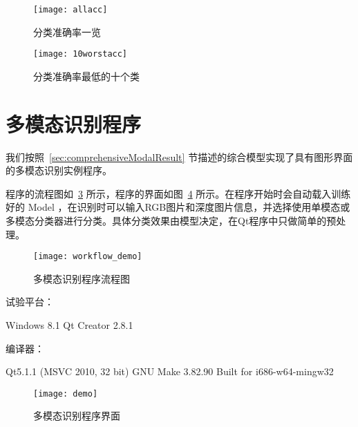 \begin{figure}[H] %
  \centering
  \texttt{[image: allacc]}
  \caption{分类准确率一览}
  \label{fig:allacc}
\end{figure}

\begin{figure}[H] %
  \centering
  \texttt{[image: 10worstacc]}
  \caption{分类准确率最低的十个类}
  \label{fig:10worstacc}
\end{figure}


\section{多模态识别程序}
\label{sec:demo}

我们按照~\ref{sec:comprehensiveModalResult} 节描述的综合模型实现了具有图形界面的多模态识别实例程序。

程序的流程图如~\ref{fig:workflow_demo} 所示，程序的界面如图~\ref{fig:demo} 所示。在程序开始时会自动载入训练好的 Model ，在识别时可以输入RGB图片和深度图片信息，并选择使用单模态或多模态分类器进行分类。具体分类效果由模型决定，在Qt程序中只做简单的预处理。

\begin{figure}[H] %
  \centering
  \texttt{[image: workflow\_demo]}
  \caption{多模态识别程序流程图}
  \label{fig:workflow_demo}
\end{figure}

试验平台：
\begin{code}
Windows 8.1
Qt Creator 2.8.1
\end{code}

编译器：
\begin{code}
Qt5.1.1 (MSVC 2010, 32 bit)
GNU Make 3.82.90
Built for i686-w64-mingw32
\end{code}

\begin{figure}[H] %
  \centering
  \texttt{[image: demo]}
  \caption{多模态识别程序界面}
  \label{fig:demo}
\end{figure}
